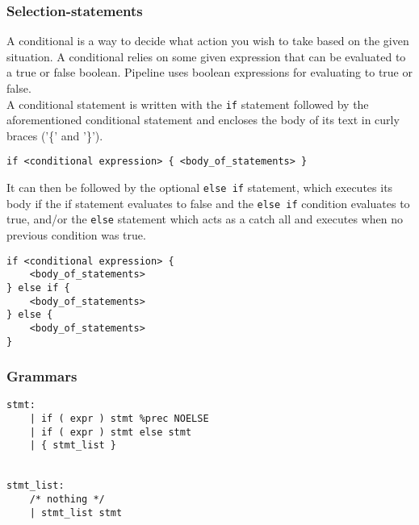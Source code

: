 \documentclass[./LRM_main.tex]{subfiles}
\begin{document}
\subsubsection{Selection-statements}
A conditional is a way to decide what action you wish to take based on the given situation. A conditional relies on some given expression that can be evaluated to a true or false boolean. Pipeline uses boolean expressions for evaluating to true or false.\\
A conditional statement is written with the \texttt{if} statement followed by the aforementioned conditional statement and encloses the body of its text in curly braces ('\{' and '\}').
\begin{lstlisting}
if <conditional expression> { <body_of_statements> }
\end{lstlisting}
It can then be followed by the optional \texttt{else if} statement, which executes its body if the if statement evaluates to false and the \texttt{else if} condition evaluates to true, and/or the \texttt{else} statement which acts as a catch all and executes when no previous condition was true.
\begin{lstlisting}
if <conditional expression> {
	<body_of_statements>
} else if {
	<body_of_statements>
} else {
	<body_of_statements>
}
\end{lstlisting}
\subsubsection{Grammars}
\begin{lstlisting}
stmt:
    | if ( expr ) stmt %prec NOELSE
    | if ( expr ) stmt else stmt
    | { stmt_list }


stmt_list:
    /* nothing */  
    | stmt_list stmt
\end{lstlisting}
\end{document}
